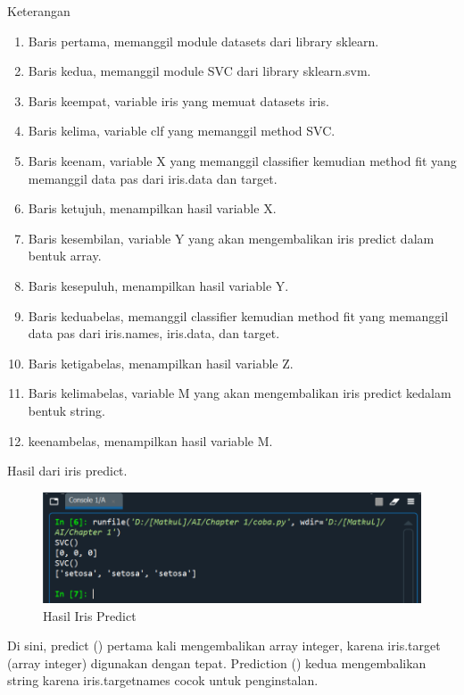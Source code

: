 \par Keterangan 
    \begin{enumerate}
        \item Baris pertama, memanggil module datasets dari library sklearn.
        \item Baris kedua, memanggil module SVC dari library sklearn.svm.
        \item Baris keempat, variable iris yang memuat datasets iris.
        \item Baris kelima, variable clf yang memanggil method SVC.
        \item Baris keenam, variable X yang memanggil classifier kemudian method fit yang memanggil data pas dari iris.data dan target.
        \item Baris ketujuh, menampilkan hasil variable X.
        \item Baris kesembilan, variable Y yang akan mengembalikan iris predict dalam bentuk array.
        \item Baris kesepuluh, menampilkan hasil variable Y.
        \item Baris keduabelas, memanggil classifier kemudian method fit yang memanggil data pas dari iris.names, iris.data, dan target.
        \item Baris ketigabelas, menampilkan hasil variable Z.
        \item Baris kelimabelas, variable M yang akan mengembalikan iris predict kedalam bentuk string.
        \item keenambelas, menampilkan hasil variable M.
    \end{enumerate}

\par Hasil dari iris predict.

    \begin{figure}[H]
    \centering
    \includegraphics[width=13cm]{figures/1184023/23.PNG}
    \caption{Hasil Iris Predict}
    \end{figure}
    
\par Di sini, predict () pertama kali mengembalikan array integer, karena iris.target (array integer) digunakan dengan tepat. Prediction () kedua mengembalikan string karena iris.targetnames cocok untuk penginstalan.

